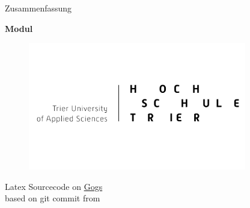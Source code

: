 \begin{titlepage}
  \begin{center}
    \begin{large}
      Zusammenfassung
    \end{large}
    
    \begin{huge}
      \begin{singlespace}
            \textbf{Modul}
      \end{singlespace}
    \end{huge}

    \vspace{0.5cm}

    \begin{figure}[h]
      \centering
      \includegraphics[width=0.85\textwidth]{images//logo.png}
      \label{img:fh-trier-logo}
    \end{figure}

    \vspace{2cm}
    
    Latex Sourcecode on \href{https://git.cryptic.systems/fh-trier/sqs_ws1718_summary}{Gogs} \\
    based on git commit  from 
    
    
  \end{center}
\end{titlepage}
